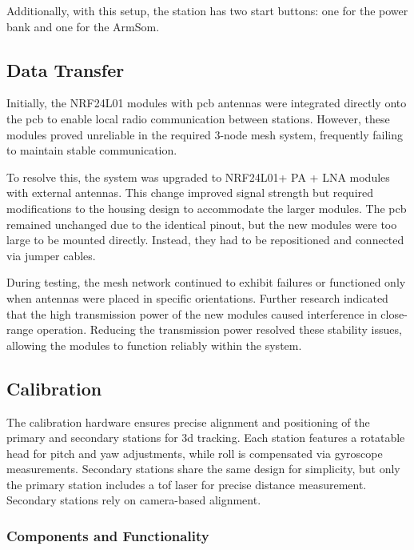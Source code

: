 Additionally, with this setup, the station has two start buttons: one for the power bank and one for the ArmSom.

\subsection{Data Transfer}

Initially, the NRF24L01 \cite{nRF24L01} modules with \acrshort{pcb} antennas were integrated directly onto the \acrshort{pcb} to enable local radio communication between stations. However, these modules proved unreliable in the required 3-node mesh system, frequently failing to maintain stable communication.

To resolve this, the system was upgraded to NRF24L01+ PA + LNA \cite{nRF24L01_plus} modules with external antennas. This change improved signal strength but required modifications to the housing design to accommodate the larger modules. The \acrshort{pcb} remained unchanged due to the identical pinout, but the new modules were too large to be mounted directly. Instead, they had to be repositioned and connected via jumper cables.

During testing, the mesh network continued to exhibit failures or functioned only when antennas were placed in specific orientations. Further research indicated that the high transmission power of the new modules caused interference in close-range operation. Reducing the transmission power resolved these stability issues, allowing the modules to function reliably within the system.

\subsection{Calibration}

The calibration hardware ensures precise alignment and positioning of the primary and secondary stations for \acrshort{3d} tracking. Each station features a rotatable head for pitch and yaw adjustments, while roll is compensated via gyroscope measurements. Secondary stations share the same design for simplicity, but only the primary station includes a \acrshort{tof} laser for precise distance measurement. Secondary stations rely on camera-based alignment.

\subsubsection*{Components and Functionality}

